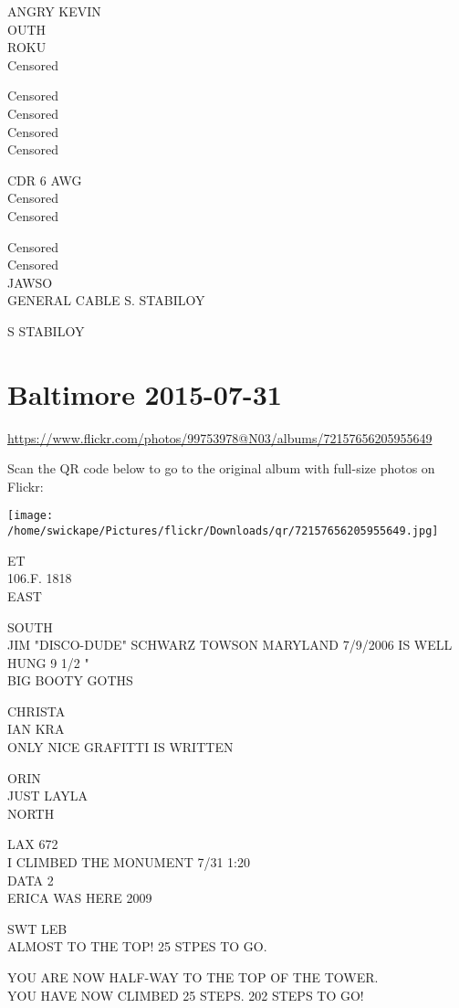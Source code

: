 \documentclass[10pt,letterpaper]{article}
\begin{document}
ANGRY KEVIN\\
OUTH\\
ROKU\\
Censored

Censored\\
Censored\\
Censored\\
Censored

CDR 6 AWG\\
Censored\\
Censored

Censored\\
Censored\\
JAWSO\\
GENERAL CABLE S. STABILOY

S STABILOY
\pagebreak

\section*{Baltimore 2015-07-31}

\url{https://www.flickr.com/photos/99753978@N03/albums/72157656205955649}

Scan the QR code below to go to the original album with full-size photos on Flickr:

\texttt{[image: /home/swickape/Pictures/flickr/Downloads/qr/72157656205955649.jpg]}
\pagebreak

ET\\
106.F. 1818\\
EAST

SOUTH\\
JIM "DISCO{-}DUDE" SCHWARZ TOWSON MARYLAND 7/9/2006 IS WELL HUNG 9 1/2 "\\
BIG BOOTY GOTHS

CHRISTA\\
IAN KRA\\
ONLY NICE GRAFITTI IS WRITTEN

ORIN\\
JUST LAYLA\\
NORTH

LAX 672\\
I CLIMBED THE MONUMENT 7/31 1:20\\
DATA 2\\
ERICA WAS HERE 2009

SWT LEB\\
ALMOST TO THE TOP!  25 STPES TO GO.

YOU ARE NOW HALF{-}WAY TO THE TOP OF THE TOWER.\\
YOU HAVE NOW CLIMBED 25 STEPS.  202 STEPS TO GO!
\end{document}
